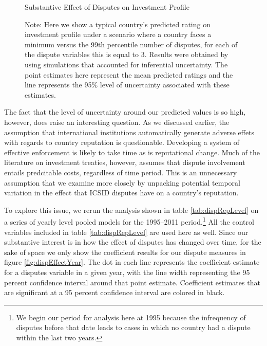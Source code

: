 \documentclass[12pt,onesided]{amsart}
\begin{document}

\begin{figure}[ht]
	\vspace{4cm}
	\centering
	\caption{Substantive Effect of Disputes on Investment Profile}
	\label{fig:subEffect}
	\resizebox{1\textwidth}{!}{}
	\caption*{Note: Here we show a typical country's predicted rating on investment profile under a scenario where a country faces a minimum versus the 99th percentile number of disputes, for each of the dispute variables this is equal to 3. Results were obtained by using simulations that accounted for inferential uncertainty. The point estimates here represent the mean predicted ratings and the line represents the 95\% level of uncertainty associated with these estimates.}
\end{figure}


The fact that the level of uncertainty around our predicted values is so high, however, does raise an interesting question. As we discussed earlier, the assumption that international institutions automatically generate adverse effets with regards to country reputation is questionable. Developing a system of effective enforcement is likely to take time as is reputational change. Much of the literature on investment treaties, however, assumes that dispute involvement entails predcitable costs, regardless of time period. This is an unnecessary assumption that we examine more closely by unpacking potential temporal variation in the effect that ICSID disputes have on a country's reputation.

To explore this issue, we rerun the analysis shown in table \ref{tab:dispRepLevel} on a series of yearly level pooled models for the 1995--2011 period.\footnote{We begin our period for analysis here at 1995 because the infrequency of disputes before that date leads to cases in which no country had a dispute within the last two years.} All the control variables included in table \ref{tab:dispRepLevel} are used here as well. Since our substantive interest is in how the effect of disputes has changed over time, for the sake of space we only show the coefficient results for our dispute measures in figure \ref{fig:dispEffectYear}. The dot in each line represents the coefficient estimate for a disputes variable in a given year, with the line width representing the 95 percent confidence interval around that point estimate. Coefficient estimates that are significant at a 95 percent confidence interval are colored in black. 
\end{document}
